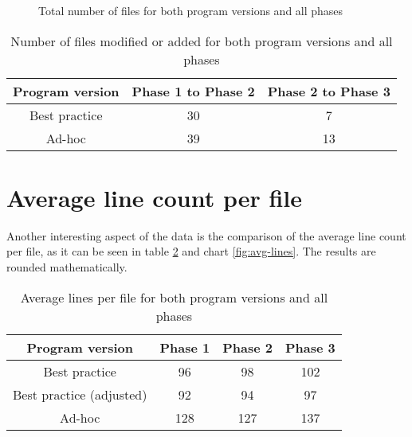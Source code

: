 \begin{figure}
	\centering

	\caption{Total number of files for both program versions and all phases}
	\label{fig:files}
\end{figure}

 \begin{table}
 	\centering

 	\begin{tabular}{|c|c|c|} \hline
 		\textbf{Program version} &\textbf{Phase 1 to Phase 2} & \textbf{Phase 2 to Phase 3} \\ \hline
 		Best practice & 30 & 7 \\ \hline
 		Ad-hoc & 39 & 13\\ \hline
 	\end{tabular}
 	\caption{Number of files modified or added for both program versions and all phases} 	\label{table:touched-files}
 \end{table}

\section{Average line count per file}
\label{sec:avg-line-count}
Another interesting aspect of the data is the comparison of the average line count per file, as it can be seen in table \ref{table:avg-lines} and chart \ref{fig:avg-lines}. The results are rounded mathematically.

\begin{table}
	\centering

	\begin{tabular}{|c|c|c|c|} \hline
		\textbf{Program version} &\textbf{Phase 1} & \textbf{Phase 2} & \textbf{Phase 3} \\ \hline
		Best practice & 96 & 98 & 102 \\ \hline
		Best practice (adjusted) & 92 & 94 & 97\\ \hline
		Ad-hoc & 128 & 127 & 137 \\ \hline
	\end{tabular}
	\caption{Average lines per file for both program versions and all phases}
	\label{table:avg-lines}
\end{table}

